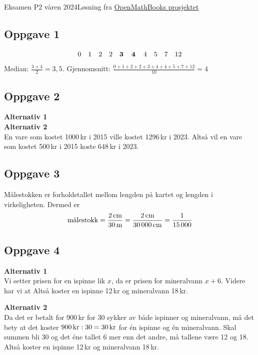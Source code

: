 





{\Large Eksamen P2 våren 2024\hfill {\footnotesize Løsning fra \color{blue} \href{https://sindreheggen.wordpress.com/}{OpenMathBooks prosjektet}}}	
\subsection*{Oppgave 1}
\[ 0\quad 1\quad 2\quad 2\quad {\textbf{3\quad 4\quad}} 4\quad 5\quad 7\quad 12 \]
Median: $\frac{3+4}{2}=3,5$. \os 
Gjennomsnitt: $\frac{0+1+2+2+3+4+4+5+7+12}{10}=4$ 

\subsection*{Oppgave 2}
\textbf{Alternativ 1}\\
\textbf{Alternativ 2}\\
En vare som kostet 1000\,kr i 2015 ville kostet 1296\,kr i 2023. Altså vil en vare som kostet 500\,kr i 2015 koste 648\,kr i 2023.  

\subsection*{Oppgave 3}
Målestokken er forholdstallet mellom lengden på kartet og lengden i virkeligheten. Dermed er
\[ \text{målestokk}=\frac{2\,\textrm{cm}}{30\,\textrm{m}}=\frac{2\,\textrm{cm}}{30\,000\,\textrm{cm}}=\frac{1}{15\,000} \]

\newpage
\subsection*{Oppgave 4}
\textbf{Alternativ 1}\\
Vi setter prisen for en ispinne lik $x$, da er prisen for mineralvann $x+6$. Videre har vi at
Altså koster en ispinne 12\,kr og mineralvann 18\,kr. \os

\textbf{Alternativ 2} \\
Da det er betalt for 900\,kr for 30 sykker av både ispinner og mineralvann, må det bety at det koster $900\,\textrm{kr}:30=30\,\textrm{kr}$ for én ispinne og én mineralvann. Skal summen bli 30 og det éne tallet 6 mer enn det andre, må tallene være 12 og 18. Altså koster en ispinne 12\,kr og mineralvann 18\,kr.

